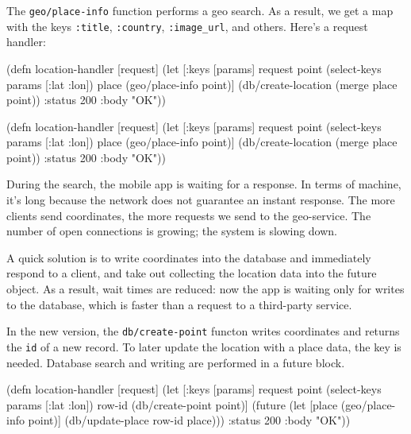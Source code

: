 The \verb|geo/place-info| function performs a geo search.
As a result, we get a map with the keys \verb|:title|, \verb|:country|, \verb|:image_url|, and others.
Here's a request handler:

\ifx\DEVICETYPE\MOBILE

\begin{english}
  \begin{clojure}
(defn location-handler [request]
  (let [{:keys [params]} request
        point (select-keys params
                [:lat :lon])
        place (geo/place-info point)]
    (db/create-location
      (merge place point))
    {:status 200 :body "OK"}))
  \end{clojure}
\end{english}

\else

\begin{english}
  \begin{clojure}
(defn location-handler [request]
  (let [{:keys [params]} request
        point (select-keys params [:lat :lon])
        place (geo/place-info point)]
    (db/create-location (merge place point))
    {:status 200 :body "OK"}))
  \end{clojure}
\end{english}

\fi

During the search, the mobile app is waiting for a response. In terms of
machine, it's long because the network does not guarantee an instant response.
The more clients send coordinates, the more requests we send to the geo-service.
The number of open connections is growing; the system is slowing down.


A quick solution is to write coordinates into the database and immediately
respond to a client, and take out collecting the location data into the future
object. As a result, wait times are reduced: now the app is waiting only for
writes to the database, which is faster than a request to a third-party service.

In the new version, the \verb|db/create-point| functon writes coordinates and
returns the \verb|id| of a new record. To later update the location with a place
data, the key is needed. Database search and writing are performed in a future
block.

\ifx\DEVICETYPE\MOBILE

\begin{english}
  \begin{clojure}
(defn location-handler
  [request]
  (let [{:keys [params]} request
        point (select-keys params
                [:lat :lon])
        row-id (db/create-point point)]
    (future
      (let [place (geo/place-info
                    point)]
        (db/update-place row-id place)))
    {:status 200 :body "OK"}))
  \end{clojure}
\end{english}

